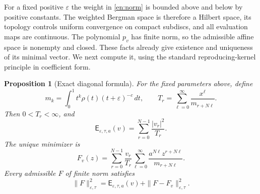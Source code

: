 \documentclass[12pt]{amsart}
\newtheorem{prop}[thm]{Proposition}
\theoremstyle{definition}
\theoremstyle{remark}
\numberwithin{equation}{section}
\newcommand{\Cost}{\mathsf E}
\theoremstyle{definition}
\begin{document}
For a fixed positive $\varepsilon$ the weight in \eqref{en:norm} is
bounded above and below by positive constants. The weighted Bergman
space is therefore a Hilbert space, its topology controls uniform
convergence on compact subdiscs, and all evaluation maps are
continuous. The polynomial $p_v$ has finite norm, so the admissible
affine space is nonempty and closed. These facts already give existence
and uniqueness of its minimal vector. We next compute it, using the
standard reproducing-kernel principle \cite{Ar50} in coefficient form.

\begin{prop}[Exact diagonal formula]\label{en:exact}
For the fixed parameters above, define
\begin{equation}\label{en:moments}
 m_k=\int_0^1t^k\rho(t)(t+\varepsilon)^{-c}\,dt,
 \qquad
 T_r=\sum_{\ell=0}^{\infty}\frac{x^\ell}{m_{r+N\ell}}.
\end{equation}
Then $0<T_r<\infty$, and
\begin{equation}\label{en:exactcost}
 \Cost_{\varepsilon,\tau,a}(v)=\sum_{r=0}^{N-1}\frac{|v_r|^2}{T_r}.
\end{equation}
The unique minimizer is
\begin{equation}\label{en:extremizer}
 F_v(z)=\sum_{r=0}^{N-1}\frac{v_r}{T_r}
 \sum_{\ell=0}^{\infty}
 \frac{a^{N\ell}z^{r+N\ell}}{m_{r+N\ell}}.
\end{equation}
Every admissible $F$ of finite norm satisfies
\begin{equation}\label{en:pythagoras}
 \|F\|_{\varepsilon,\tau}^2
 =\Cost_{\varepsilon,\tau,a}(v)+\|F-F_v\|_{\varepsilon,\tau}^2.
\end{equation}
\end{prop}
\end{document}
